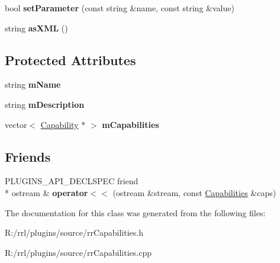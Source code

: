 \begin{DoxyCompactItemize}
\item 
\hypertarget{classrrp_1_1_capabilities_ac83238c1de590eeafbb2905b3cd2a9dc}{bool {\bfseries set\-Parameter} (const string \&name, const string \&value)}\label{classrrp_1_1_capabilities_ac83238c1de590eeafbb2905b3cd2a9dc}

\item 
\hypertarget{classrrp_1_1_capabilities_a38a56c814f169a0169948f5fb51ad7f7}{string {\bfseries as\-X\-M\-L} ()}\label{classrrp_1_1_capabilities_a38a56c814f169a0169948f5fb51ad7f7}

\end{DoxyCompactItemize}
\subsection*{Protected Attributes}
\begin{DoxyCompactItemize}
\item 
\hypertarget{classrrp_1_1_capabilities_a1e458281effaffe16418036bea0ca965}{string {\bfseries m\-Name}}\label{classrrp_1_1_capabilities_a1e458281effaffe16418036bea0ca965}

\item 
\hypertarget{classrrp_1_1_capabilities_aeae892c98725d57e94ef8d8d2eee7477}{string {\bfseries m\-Description}}\label{classrrp_1_1_capabilities_aeae892c98725d57e94ef8d8d2eee7477}

\item 
\hypertarget{classrrp_1_1_capabilities_a8dabf9e6efa4a14dcbfc2dfb5e4e22b9}{vector$<$ \hyperlink{classrrp_1_1_capability}{Capability} $\ast$ $>$ {\bfseries m\-Capabilities}}\label{classrrp_1_1_capabilities_a8dabf9e6efa4a14dcbfc2dfb5e4e22b9}

\end{DoxyCompactItemize}
\subsection*{Friends}
\begin{DoxyCompactItemize}
\item 
\hypertarget{classrrp_1_1_capabilities_a382b624e8ff27059c7116026ab94b550}{P\-L\-U\-G\-I\-N\-S\-\_\-\-A\-P\-I\-\_\-\-D\-E\-C\-L\-S\-P\-E\-C friend \\*
ostream \& {\bfseries operator$<$$<$} (ostream \&stream, const \hyperlink{classrrp_1_1_capabilities}{Capabilities} \&caps)}\label{classrrp_1_1_capabilities_a382b624e8ff27059c7116026ab94b550}

\end{DoxyCompactItemize}


The documentation for this class was generated from the following files\-:\begin{DoxyCompactItemize}
\item 
R\-:/rrl/plugins/source/rr\-Capabilities.\-h\item 
R\-:/rrl/plugins/source/rr\-Capabilities.\-cpp\end{DoxyCompactItemize}
